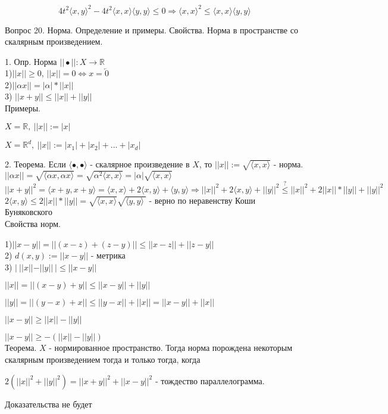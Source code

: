 \documentclass[12pt]{article}
\begin{document}
\[4t^2\langle x, y \rangle^2 - 4t^2\langle x, x \rangle \langle y, y \rangle \leq 0 \Rightarrow \langle x, x \rangle^2 \leq \langle x, x \rangle \langle y, y \rangle\]
\newpage

\begin{center}
Вопрос 20. Норма. Определение и примеры. Свойства. Норма в пространстве со скалярным произведением.
\end{center}

1. Опр. Норма $||\bullet || : X\to \mathbb{R}$\\

1)$||x|| \geq 0$, $||x|| = 0 \Leftrightarrow x = \overleftarrow{0}$\\

2)$||\alpha x|| = |\alpha|*||x||$\\

3) $||x+y|| \leq ||x||+||y||$\\

Примеры.

$X = \mathbb{R},\ ||x||:=|x|$

$X = \mathbb{R}^d,\ ||x||:=|x_1|+|x_2|+...+|x_d|$

2. Теорема. Если $\langle \bullet, \bullet \rangle$ - скалярное произведение в $X$, то $||x||:= \sqrt{\langle x, x \rangle}$ - норма.\\

$||\alpha x|| = \sqrt{\langle \alpha x, \alpha x\rangle} = \sqrt{\alpha^2 \langle x, x\rangle} = |\alpha|\sqrt{\langle x, x \rangle}$\\

$||x+y||^2 = \langle x+y, x+y \rangle = \langle x,x\rangle + 2\langle x, y\rangle + \langle y, y\rangle \Rightarrow ||x||^2 + 2\langle x, y\rangle + ||y||^2 \overset{?}{\leq} ||x||^2 + 2||x||*||y|| + ||y||^2$\\

$2\langle x, y \rangle \leq 2||x||*||y|| = \sqrt{\langle x, x\rangle}\sqrt{\langle y, y\rangle\ }$ - верно по неравенству Коши Буняковского\\

Свойства норм.

1)$||x-y||=||(x-z)+(z-y)|| \leq 	||x-z||+||z-y||$\\

2) $d(x, y):=||x-y||$ - метрика\\

3) $|\ ||x||-||y||\ | \leq ||x-y||$

$||x|| = ||(x-y)+y|| \leq ||x-y||+||y||$

$||y|| = ||(y-x)+x|| \leq ||y-x||+||x||=||x-y||+||x||$ 

$||x-y||\geq ||x||-||y||$

$||x-y||\geq -(||x||-||y||)$\\

Теорема. $X$ - нормированное пространство. Тогда норма порождена некоторым скалярным произведением тогда и только тогда, когда

$2(||x||^2+||y||^2)=||x+y||^2+||x-y||^2$ - тождество параллелограмма.

Доказательства не будет
\end{document}
